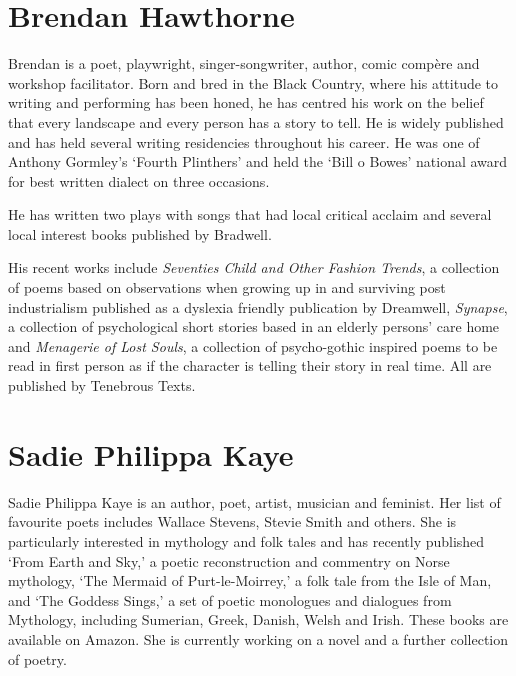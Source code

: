 
\section*{Brendan Hawthorne}%



Brendan is a poet, playwright, singer-songwriter, author, comic
compère and workshop facilitator. Born and bred in the Black Country,
where his attitude to writing and performing has been honed, he has
centred his work on the belief that every landscape and every person
has a story to tell. He is widely published and has held several
writing residencies throughout his career. He was one of Anthony
Gormley’s ‘Fourth Plinthers’ and held the ‘Bill o Bowes’ national
award for best written dialect on three occasions.

He has written two plays with songs that had local critical acclaim
and several local interest books published by Bradwell.

His recent works include \textit{Seventies Child and Other Fashion Trends}, a
collection of poems based on observations when growing up in and
surviving post industrialism published as a dyslexia friendly
publication by Dreamwell, \textit{Synapse}, a collection of psychological
short stories based in an elderly persons' care home and \textit{Menagerie of
Lost Souls}, a collection of psycho-gothic inspired poems to be read in
first person as if the character is telling their story in real
time. All are published by Tenebrous Texts.

\section*{Sadie Philippa Kaye}%

Sadie Philippa Kaye %
is an author, poet, artist, musician
and feminist. Her list of favourite poets includes Wallace Stevens,
Stevie Smith and others.  She is particularly interested in mythology
and folk tales and has recently published `From Earth and Sky,' a
poetic reconstruction and commentry on Norse mythology, `The Mermaid
of Purt-le-Moirrey,' a folk tale from the Isle of Man, and `The
Goddess Sings,' a set of poetic monologues and dialogues from
Mythology, including Sumerian, Greek, Danish, Welsh and Irish.  These
books are available on Amazon. She is currently working on a novel and
a further collection of poetry.

